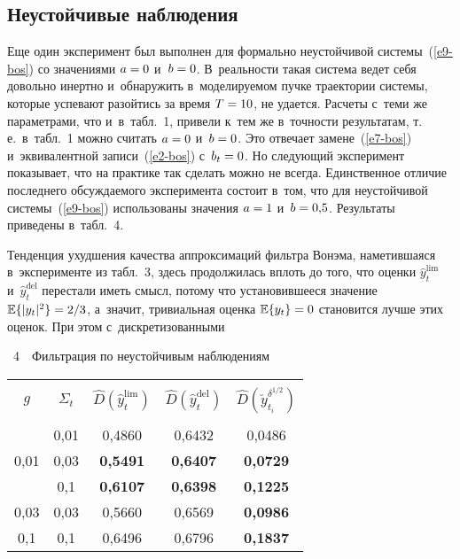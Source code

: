 \begin{multicols}{2}
      
\subsection{Неустойчивые наблюдения}

\vspace*{-2pt}

      Еще один эксперимент был выполнен для формально неустойчивой 
сис\-те\-мы~(\ref{e9-bos}) со значениями $a\hm=0$ и~$b\hm=0$. В~ре\-аль\-ности такая сис\-те\-ма 
ведет себя довольно инерт\-но и~обнаружить в~мо\-де\-ли\-ру\-емом пучке 
траектории сис\-те\-мы, которые успевают разойтись за время $T\hm=10$, не 
удается. Расчеты с~теми же параметрами, что и~в~табл.~1, привели к~тем же в~точ\-ности результатам, 
т.\,е.\ в~табл.~1 мож\-но считать $a\hm=0$ и~$b\hm=0$. 
Это отвечает замене~(\ref{e7-bos}) и~эквивалентной записи~(\ref{e2-bos}) с~$b_t\hm=0$. Но 
сле\-ду\-ющий эксперимент показывает, что на практике так сделать можно не 
всегда. Единственное отличие по\-след\-не\-го об\-суж\-да\-емо\-го эксперимента 
со\-сто\-ит в~том, что для неустойчивой сис\-те\-мы~(\ref{e9-bos}) использованы значения 
$a\hm=1$ и~$b\hm=0{,}5$. Результаты приведены в~табл.~4.
      

      
      Тенденция ухудшения качества аппроксимаций фильт\-ра Вонэма, 
наметившаяся в~эксперименте из табл.~3, здесь продолжилась вплоть до того, 
что оценки $\hat{y}_t^{\mathrm{lim}}$ и~$\hat{y}_t^{\mathrm{del}}$ перестали иметь смысл, 
потому что уста\-но\-вив\-ше\-еся значение $\mathbb{E}\{ \vert y_t\vert^2\} \hm= 
2/3$,
 а~значит, тривиальная оценка $\mathbb{E}\{y_t\}\hm=0$ становится 
лучше этих оценок. При этом с~дискретизованными\linebreak\vspace*{-12pt}

\begin{center}
\parbox{78mm}{{\tablename~4}\ \ \small{Фильтрация по неустойчивым наблюде\-ниям
}}

      \vspace*{6pt}
      
      {\small 
      \tabcolsep=8pt
      \begin{tabular}{|c|c|c|c|c|}
      \hline
&&&&\\[-9pt]
$g$&$\Sigma_t$ & $\hat{D}\left(\hat{y}_t^{\mathrm{lim}}\right)$ &$\hat{D}\left(\hat{y}_t^{\mathrm{del}}\right)$ &
$\hat{D}\left(\breve{y}_{t_i}^{\delta^{1/2}}\right)$\\
&&&&\\[-9pt]
\hline
 &  0{,}01 &0,4860&0,6432&0,0486\\
0{,}01 &  0{,}03&\textbf{0,5491}&\textbf{0,6407}&\textbf{0,0729}\\
 & 0{,}1\hphantom{9}&\textbf{0,6107}&\textbf{0,6398}&\textbf{0,1225}\\
 \hline
0{,}03 & 0{,}03&0,5660&0,6569&\textbf{0,0986}\\
\hline
0{,}1\hphantom{9} &  0{,}1\hphantom{9}&0,6496&0,6796&\textbf{0,1837}\\
\hline
\end{tabular}
}


\end{center}
\end{multicols}
